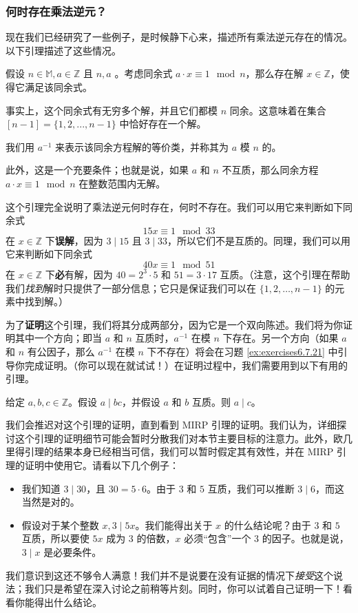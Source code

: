 \subsubsection*{何时存在乘法逆元？}

现在我们已经研究了一些例子，是时候静下心来，描述所有乘法逆元存在的情况。以下引理描述了这些情况。

\begin{lemma}
    假设 $n \in \mathbb{M}, a \in \mathbb{Z}$ 且 $n, a$ 。考虑同余式 $a \cdot x \equiv 1 \mod n$，那么存在解 $x \in \mathbb{Z}$，使得它满足该同余式。

    事实上，这个同余式有无穷多个解，并且它们都模 $n$ 同余。这意味着在集合 $[n - 1] = \{1, 2, ... , n-1\}$ 中恰好存在一个解。

    我们用 $a^{-1}$ 来表示该同余方程解的等价类，并称其为 $a$ 模 $n$ 的。

    此外，这是一个充要条件；也就是说，如果 $a$ 和 $n$ 不互质，那么同余方程 $a \cdot x \equiv 1 \mod n$ 在整数范围内无解。
\end{lemma}

这个引理完全说明了乘法逆元何时存在，何时不存在。我们可以用它来判断如下同余式
\[15x \equiv 1 \mod 33\]
在 $x \in \mathbb{Z}$ 下\textbf{误解}，因为 $3 \mid 15$ 且 $3 \mid 33$，所以它们不是互质的。同理，我们可以用它来判断如下同余式
\[40x \equiv 1 \mod 51\]
在 $x \in \mathbb{Z}$ 下\textbf{必}有解，因为 $40 = 2^3 \cdot 5$ 和 $51 = 3 \cdot 17$ 互质。（注意，这个引理在帮助我们\emph{找到}解时只提供了一部分信息；它只是保证我们可以在 $\{1, 2, \dots , n-1\}$ 的元素中找到解。）

为了\textbf{证明}这个引理，我们将其分成两部分，因为它是一个双向陈述。我们将为你证明其中一个方向；即当 $a$ 和 $n$ 互质时，$a^{-1}$ 在模 $n$ 下存在。另一个方向（如果 $a$ 和 $n$ 有公因子，那么 $a^{-1}$ 在模 $n$ 下不存在）将会在习题 \ref{ex:exercises6.7.21} 中引导你完成证明。（你可以现在就试试！）在证明过程中，我们需要用到以下有用的引理。

\begin{lemma}[欧几里得引理]\label{lemma6.5.25}
    给定 $a, b, c \in \mathbb{Z}$。假设 $a \mid bc$，并假设 $a$ 和 $b$ 互质。则 $a \mid c$。
\end{lemma}

我们会推迟对这个引理的证明，直到看到 MIRP 引理的证明。我们认为，详细探讨这个引理的证明细节可能会暂时分散我们对本节主要目标的注意力。此外，欧几里得引理的结果本身已经相当可信，我们可以暂时假定其有效性，并在 MIRP 引理的证明中使用它。请看以下几个例子：
\begin{itemize}
    \item 我们知道 $3 \mid 30$，且 $30 = 5 \cdot 6$。由于 $3$ 和 $5$ 互质，我们可以推断 $3 \mid 6$，而这当然是对的。
    \item 假设对于某个整数 $x, 3 \mid 5x$。我们能得出关于 $x$ 的什么结论呢？由于 $3$ 和 $5$ 互质，所以要使 $5x$ 成为 $3$ 的倍数，$x$ 必须``包含''一个 $3$ 的因子。也就是说，$3 \mid x$ 是必要条件。
\end{itemize}
我们意识到这还不够令人满意！我们并不是说要在没有证据的情况下\emph{接受}这个说法；我们只是希望在深入讨论之前稍等片刻。同时，你可以试着自己证明一下！看看你能得出什么结论。

